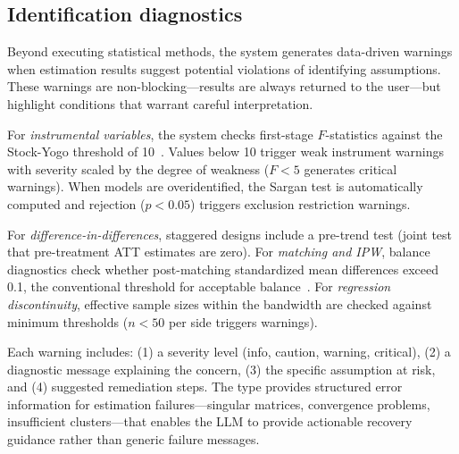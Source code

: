 \subsection{Identification diagnostics}

Beyond executing statistical methods, the system generates data-driven
warnings when estimation results suggest potential violations of identifying
assumptions. These warnings are non-blocking---results are always returned
to the user---but highlight conditions that warrant careful interpretation.

For \emph{instrumental variables}, the system checks first-stage
$F$-statistics against the Stock-Yogo threshold of
10~\citep{Stock+Yogo:2005}. Values below 10 trigger weak instrument warnings
with severity scaled by the degree of weakness ($F < 5$ generates critical
warnings). When models are overidentified, the Sargan test is automatically
computed and rejection ($p < 0.05$) triggers exclusion restriction warnings.

For \emph{difference-in-differences}, staggered designs include a pre-trend
test (joint test that pre-treatment ATT estimates are zero). For
\emph{matching and IPW}, balance diagnostics check whether post-matching
standardized mean differences exceed 0.1, the conventional threshold for
acceptable balance~\citep{Austin:2011}. For \emph{regression discontinuity},
effective sample sizes within the bandwidth are checked against minimum
thresholds ($n < 50$ per side triggers warnings).

Each warning includes: (1) a severity level (info, caution, warning, critical),
(2) a diagnostic message explaining the concern, (3) the specific assumption
at risk, and (4) suggested remediation steps. The  type
provides structured error information for estimation failures---singular
matrices, convergence problems, insufficient clusters---that enables the LLM
to provide actionable recovery guidance rather than generic failure messages.

